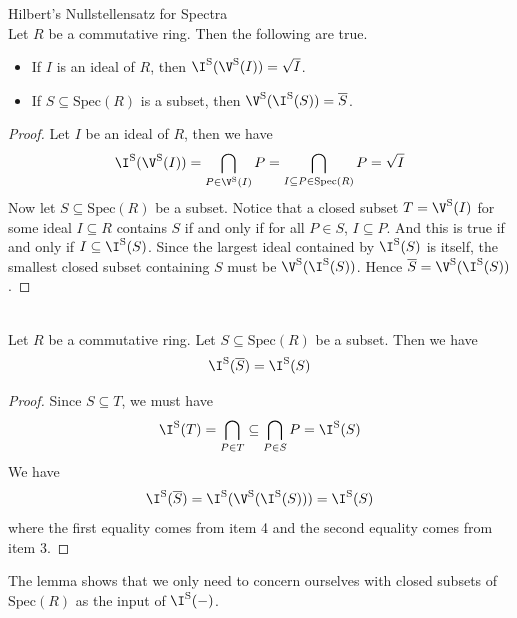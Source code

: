 \documentclass[a4paper]{article}
\begin{document}
\begin{prp}{Hilbert's Nullstellensatz for Spectra}{}\\
Let $R$ be a commutative ring. Then the following are true. 
\begin{itemize}
\item If $I$ is an ideal of $R$, then $\I^\text{S}(\V^\text{S}(I))=\sqrt{I}$. 
\item If $S\subseteq\text{Spec}(R)$ is a subset, then $\V^\text{S}(\I^\text{S}(S))=\overline{S}$. 
\end{itemize}
\begin{proof}
Let $I$ be an ideal of $R$, then we have $$\I^\text{S}(\V^\text{S}(I))=\bigcap_{P\in\V^\text{S}(I)}P=\bigcap_{I\subseteq P\in\text{Spec}(R)}P=\sqrt{I}$$ Now let $S\subseteq\text{Spec}(R)$ be a subset. Notice that a closed subset $T=\V^\text{S}(I)$ for some ideal $I\subseteq R$ contains $S$ if and only if for all $P\in S$, $I\subseteq P$. And this is true if and only if $I\subseteq\I^\text{S}(S)$. Since the largest ideal contained by $\I^\text{S}(S)$ is itself, the smallest closed subset containing $S$ must be $\V^\text{S}(\I^\text{S}(S))$. Hence $\overline{S}=\V^\text{S}(\I^\text{S}(S))$. 
\end{proof}
\end{prp}

\begin{lmm}{}{}\\
Let $R$ be a commutative ring. Let $S\subseteq\text{Spec}(R)$ be a subset. Then we have $$\I^\text{S}(\overline{S})=\I^\text{S}(S)$$
\begin{proof}
Since $S\subseteq T$, we must have $$\I^\text{S}(T)=\bigcap_{P\in T}\subseteq\bigcap_{P\in S}P=\I^\text{S}(S)$$
We have $$\I^\text{S}(\overline{S})=\I^\text{S}(\V^\text{S}(\I^\text{S}(S)))=\I^\text{S}(S)$$ where the first equality comes from item 4 and the second equality comes from item 3. 
\end{proof}
\end{lmm}

The lemma shows that we only need to concern ourselves with closed subsets of $\text{Spec}(R)$ as the input of $\I^\text{S}(-)$. 
\end{document}
